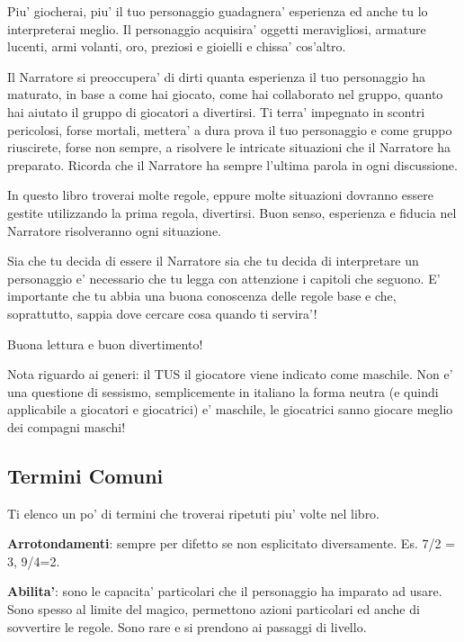 \documentclass[a4paper,11pt,twoside,openany]{dndbook}
\begin{document}
Piu' giocherai, piu' il tuo personaggio guadagnera' esperienza ed anche tu lo interpreterai meglio. Il personaggio acquisira' oggetti meravigliosi, armature lucenti, armi volanti, oro, preziosi e gioielli e chissa' cos'altro.

Il Narratore si preoccupera' di dirti quanta esperienza il tuo personaggio ha maturato, in base a come hai giocato, come hai collaborato nel gruppo, quanto hai aiutato il gruppo di giocatori a divertirsi. Ti terra' impegnato in scontri pericolosi, forse mortali, mettera' a dura prova il tuo personaggio e come gruppo riuscirete, forse non sempre, a risolvere le intricate situazioni che il Narratore ha preparato. Ricorda che il Narratore ha sempre l'ultima parola in ogni discussione.

In questo libro troverai molte regole, eppure molte situazioni dovranno essere gestite utilizzando la prima regola, divertirsi. Buon senso, esperienza e fiducia nel Narratore risolveranno ogni situazione.

Sia che tu decida di essere il Narratore sia che tu decida di interpretare un personaggio e' necessario che tu legga con attenzione i capitoli che seguono.
E' importante che tu abbia una buona conoscenza delle regole base e che, soprattutto, sappia dove cercare cosa quando ti servira'!

Buona lettura e buon divertimento!

Nota riguardo ai generi: il TUS il giocatore viene indicato come maschile. Non e' una questione di sessismo, semplicemente in italiano la forma neutra (e quindi applicabile a giocatori e giocatrici) e' maschile, le giocatrici sanno giocare meglio dei compagni maschi!

\pagebreak{}

\subsection{Termini Comuni}

Ti elenco un po' di termini che troverai ripetuti piu' volte nel libro.

\textbf{Arrotondamenti}: sempre per difetto se non esplicitato diversamente. Es. 7/2 = 3, 9/4=2.

\textbf{Abilita'}: sono le capacita' particolari che il personaggio ha imparato ad usare. Sono spesso al limite del magico, permettono azioni particolari ed anche di sovvertire le regole. Sono rare e si prendono ai passaggi di livello.
\end{document}
